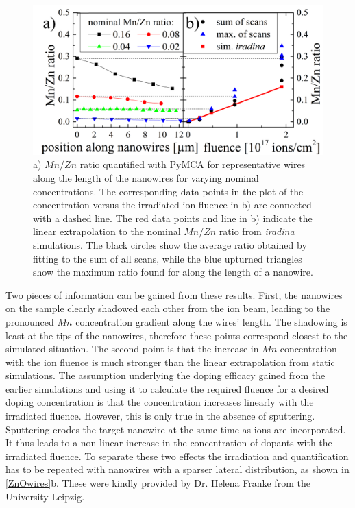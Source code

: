\begin{figure}
	\centering
		\includegraphics[width=.8\textwidth]{images/MnZn1.png}
	\caption{a) $Mn/Zn$ ratio quantified with PyMCA for representative wires along the length of the nanowires for varying nominal concentrations. The corresponding data points in the plot of the concentration versus the irradiated ion fluence in b) are connected with a dashed line. The red data points and line in b) indicate the linear extrapolation to the nominal $Mn/Zn$ ratio from \emph{iradina} simulations. The black circles show the average ratio obtained by fitting to the sum of all scans, while the blue upturned triangles show the maximum ratio found for along the length of a nanowire.}
	\label{MnZn1}
\end{figure} 
 
Two pieces of information can be gained from these results. First, the nanowires on the sample clearly shadowed each other from the ion beam, leading to the pronounced $Mn$ concentration gradient along the wires' length. The shadowing is least at the tips of the nanowires, therefore these points correspond closest to the simulated situation. The second point is that the increase in $Mn$ concentration with the ion fluence is much stronger than the linear extrapolation from static simulations. The assumption underlying the doping efficacy gained from the earlier simulations and using it to calculate the required fluence for a desired doping concentration is that the concentration increases linearly with the irradiated fluence. However, this is only true in the absence of sputtering. Sputtering erodes the target nanowire at the same time as ions are incorporated. It thus leads to a non-linear increase in the concentration of dopants with the irradiated fluence. To separate these two effects the irradiation and quantification has to be repeated with nanowires with a sparser lateral distribution, as shown in \ref{ZnOwires}b. These were kindly provided by Dr. Helena Franke from the University Leipzig.

